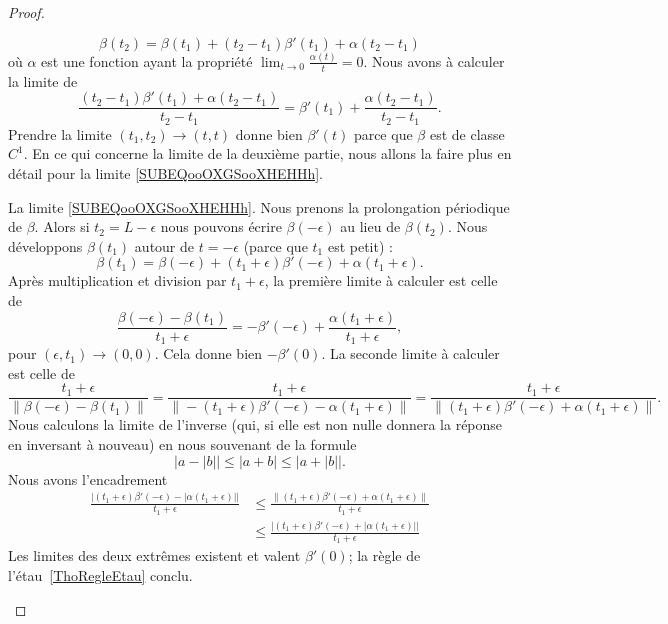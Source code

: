 \begin{proof}
\begin{subproof}
		\begin{equation}
			\beta(t_2)=\beta(t_1)+(t_2-t_1)\beta'(t_1)+\alpha(t_2-t_1)
		\end{equation}
		où \( \alpha\) est une fonction ayant la propriété \( \lim_{t\to 0} \frac{ \alpha(t) }{ t }=0\). Nous avons à calculer la limite de
		\begin{equation}
			\frac{ (t_2-t_1)\beta'(t_1)+\alpha(t_2-t_1) }{ t_2-t_1 }=\beta'(t_1)+\frac{ \alpha(t_2-t_1) }{ t_2-t_1 }.
		\end{equation}
		Prendre la limite \( (t_1,t_2)\to (t,t)\) donne bien \( \beta'(t)\) parce que \( \beta\) est de classe \( C^1\). En ce qui concerne la limite de la deuxième partie, nous allons la faire plus en détail pour la limite \eqref{SUBEQooOXGSooXHEHHh}.

		La limite \eqref{SUBEQooOXGSooXHEHHh}. Nous prenons la prolongation périodique de \( \beta\). Alors si \( t_2=L-\epsilon\) nous pouvons écrire \( \beta(-\epsilon)\) au lieu de \( \beta(t_2)\). Nous développons \( \beta(t_1)\) autour de \( t=-\epsilon\) (parce que \( t_1\) est petit) :
		\begin{equation}
			\beta(t_1)=\beta(-\epsilon)+(t_1+\epsilon)\beta'(-\epsilon)+\alpha(t_1+\epsilon).
		\end{equation}
		Après multiplication et division par \( t_1+\epsilon\), la première limite à calculer est celle de
		\begin{equation}
			\frac{ \beta(-\epsilon)-\beta(t_1) }{ t_1+\epsilon }=-\beta'(-\epsilon)+\frac{ \alpha(t_1+\epsilon) }{ t_1+\epsilon },
		\end{equation}
		pour \( (\epsilon,t_1)\to (0,0)\). Cela donne bien \( -\beta'(0)\). La seconde limite à calculer est celle de
		\begin{equation}
			\frac{ t_1+\epsilon }{ \| \beta(-\epsilon)-\beta(t_1) \| }=\frac{ t_1+\epsilon }{ \| -(t_1+\epsilon)\beta'(-\epsilon)-\alpha(t_1+\epsilon) \| }=\frac{ t_1+\epsilon }{ \| (t_1+\epsilon)\beta'(-\epsilon)+\alpha(t_1+\epsilon) \| }.
		\end{equation}
		Nous calculons la limite de l'inverse (qui, si elle est non nulle donnera la réponse en inversant à nouveau) en nous souvenant de la formule
		\begin{equation}
			\big|  a-| b | \big|  \leq | a+b |\leq \big|    a+| b |\big|.
		\end{equation}
		Nous avons l'encadrement
		\begin{subequations}
			\begin{align}
				\frac{  \big| (t_1+\epsilon)\beta'(-\epsilon)-| \alpha(t_1+\epsilon) | \big| }{ t_1+\epsilon } & \leq \frac{ \|  (t_1+\epsilon)\beta'(-\epsilon)+ \alpha(t_1+\epsilon) \|  }{ t_1+\epsilon }           \\
				                                                                                               & \leq  \frac{ \big|   (t_1+\epsilon)\beta'(-\epsilon)+| \alpha(t_1+\epsilon) | \big| }{ t_1+\epsilon }
			\end{align}
		\end{subequations}
		Les limites des deux extrêmes existent et valent \( \beta'(0)\); la règle de l'étau~\ref{ThoRegleEtau} conclu.


\end{subproof}
\end{proof}
